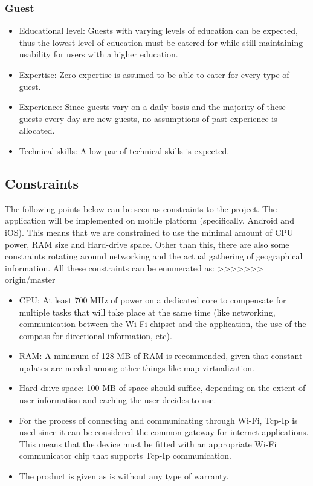 \documentclass[runningheads,a4paper]{article}
\begin{document}
\subsubsection{Guest}

\begin{itemize}
	 
		\item Educational level: Guests with varying levels of education can be expected, thus the lowest level of education must be catered for while still maintaining usability for users with a higher education. 
		\item Expertise: Zero expertise is assumed to be able to cater for every type of guest.
		\item Experience: Since guests vary on a daily basis and the majority of these guests every day are new guests, no assumptions of past experience is allocated.
		\item Technical skills: A low par of technical skills is expected.
	 
\end{itemize}

\subsection{Constraints}
The following points below can be seen as constraints to the project.
The application will be implemented on mobile platform (specifically, Android and iOS). This means that we are constrained to use the minimal amount of CPU power, RAM size and Hard-drive space. Other than this, there are also some constraints rotating around networking and the actual gathering of geographical information. All these constraints can be enumerated as:
>>>>>>> origin/master

\begin{itemize}
	 
		\item CPU: At least 700 MHz of power on a dedicated core to compensate for multiple tasks that will take place at the same time (like networking, communication between the Wi-Fi chipset and the application, the use of the compass for directional information, etc).
		
		\item RAM: A minimum of 128 MB of RAM is recommended, given that constant updates are needed among other things like map virtualization.
		
		\item Hard-drive space: 100 MB of space should suffice, depending on the extent of user information and caching the user decides to use.
		
		\item For the process of connecting and communicating through Wi-Fi, Tcp-Ip is used since it can be considered the common gateway for internet applications. This means that the device must be fitted with an appropriate Wi-Fi communicator chip that supports Tcp-Ip communication.
		
		\item The product is given as is without any type of warranty.
	 
\end{itemize}
 
\end{document}
